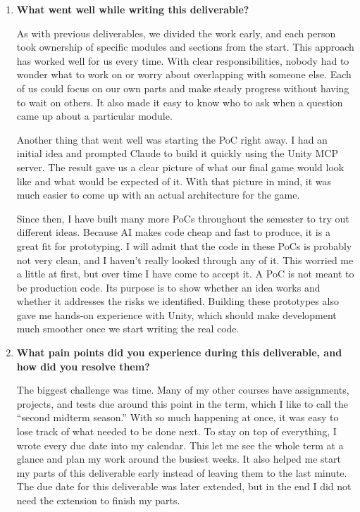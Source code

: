 \documentclass[10pt, titlepage]{article}
\begin{document}
\begin{enumerate}
    \item \textbf{What went well while writing this deliverable?}

    As with previous deliverables, we divided the work early, and each
    person took ownership of specific modules and sections from the start.
    This approach has worked well for us every time. With clear
    responsibilities, nobody had to wonder what to work on or worry about
    overlapping with someone else. Each of us could focus on our own parts
    and make steady progress without having to wait on others. It also
    made it easy to know who to ask when a question came up about a
    particular module.

    Another thing that went well was starting the PoC right away. I had an
    initial idea and prompted Claude to build it quickly using the Unity
    MCP server. The result gave us a clear picture of what our final game
    would look like and what would be expected of it. With that picture in
    mind, it was much easier to come up with an actual architecture for
    the game.

    Since then, I have built many more PoCs throughout the semester to try
    out different ideas. Because AI makes code cheap and fast to produce,
    it is a great fit for prototyping. I will admit that the code in these
    PoCs is probably not very clean, and I haven't really looked through
    any of it. This worried me a little at first, but over time I have
    come to accept it. A PoC is not meant to be production code. Its
    purpose is to show whether an idea works and whether it addresses the
    risks we identified. Building these prototypes also gave me hands-on
    experience with Unity, which should make development much smoother
    once we start writing the real code.

    \item \textbf{What pain points did you experience during this
    deliverable, and how did you resolve them?}

    The biggest challenge was time. Many of my other courses have
    assignments, projects, and tests due around this point in the term,
    which I like to call the ``second midterm season.'' With so much
    happening at once, it was easy to lose track of what needed to be done
    next. To stay on top of everything, I wrote every due date into my
    calendar. This let me see the whole term at a glance and plan my work
    around the busiest weeks. It also helped me start my parts of this
    deliverable early instead of leaving them to the last minute. The due
    date for this deliverable was later extended, but in the end I did not
    need the extension to finish my parts.


\end{enumerate}
\end{document}
